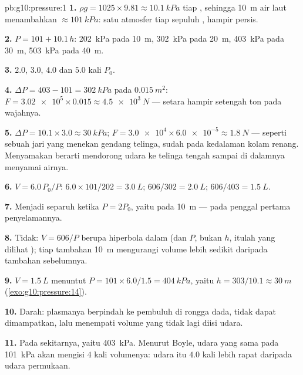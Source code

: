 \begin{solution}{pb:g10:pressure:1}
\textbf{1.} $\rho g = 1025 \times 9.81 \approx \qty{10.1}{kPa}$ tiap
, sehingga \qty{10}{m} air laut menambahkan
$\approx \qty{101}{kPa}$: satu atmosfer tiap sepuluh , hampir
persis.

\textbf{2.} $P = 101 + 10.1\,h$: \qty{202}{kPa} pada \qty{10}{m},
\qty{302}{kPa} pada \qty{20}{m}, \qty{403}{kPa} pada \qty{30}{m},
\qty{503}{kPa} pada \qty{40}{m}.

\textbf{3.} $2.0$, $3.0$, $4.0$ dan $5.0$ kali $P_0$.

\textbf{4.} $\Delta P = 403 - 101 = \qty{302}{kPa}$ pada
$\qty{0.015}{m^2}$: $F = \num{3.02e5} \times 0.015 \approx
\qty{4.5e3}{N}$ --- setara  hampir setengah ton pada wajahnya.

\textbf{5.} $\Delta P = 10.1 \times 3.0 \approx \qty{30}{kPa}$;
$F = \num{3.0e4} \times \num{6.0e-5} \approx \qty{1.8}{N}$ --- seperti
sebuah jari yang menekan gendang telinga, sudah pada kedalaman kolam
renang. Menyamakan  berarti mendorong udara ke telinga tengah
sampai  di dalamnya menyamai  airnya.

\textbf{6.} $V = 6.0 \, P_0/P$: $6.0 \times 101/202 = \qty{3.0}{L}$;
$606/302 = \qty{2.0}{L}$; $606/403 = \qty{1.5}{L}$.

\textbf{7.} Menjadi separuh ketika $P = 2P_0$, yaitu pada \qty{10}{m}
--- pada penggal pertama penyelamannya.

\textbf{8.} Tidak: $V = 606/P$ berupa hiperbola dalam 
(dan $P$, bukan $h$, itulah yang dilihat ); tiap tambahan
\qty{10}{m} mengurangi volume lebih sedikit daripada tambahan
sebelumnya.

\textbf{9.} $V = \qty{1.5}{L}$ menuntut
$P = 101 \times 6.0/1.5 = \qty{404}{kPa}$, yaitu
$h = 303/10.1 \approx \qty{30}{m}$ (\cref{exo:g10:pressure:14}).

\textbf{10.} Darah: plasmanya berpindah ke pembuluh di rongga dada,
tidak dapat dimampatkan, lalu menempati volume yang tidak lagi diisi
udara.

\textbf{11.} Pada  sekitarnya, yaitu \qty{403}{kPa}. Menurut
Boyle, udara yang sama pada \qty{101}{kPa} akan mengisi $4$ kali
volumenya: udara itu $4.0$ kali lebih rapat daripada udara permukaan.


\end{solution}
